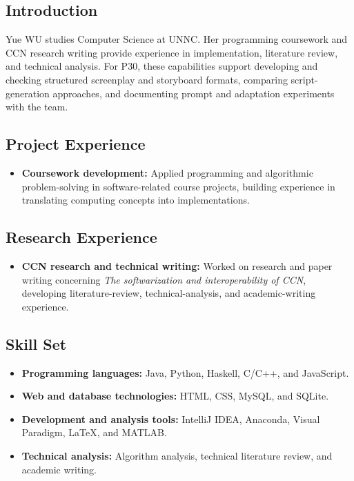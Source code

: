 \documentclass[a4paper,12pt]{article}
\begin{document}
\subsection*{Introduction}
Yue WU studies Computer Science at UNNC. Her programming coursework and CCN research writing provide experience in implementation, literature review, and technical analysis. For P30, these capabilities support developing and checking structured screenplay and storyboard formats, comparing script-generation approaches, and documenting prompt and adaptation experiments with the team.

\subsection*{Project Experience}
\begin{itemize}
  \item \textbf{Coursework development:} Applied programming and algorithmic problem-solving in software-related course projects, building experience in translating computing concepts into implementations.
\end{itemize}

\subsection*{Research Experience}
\begin{itemize}
  \item \textbf{CCN research and technical writing:} Worked on research and paper writing concerning \emph{The softwarization and interoperability of CCN}, developing literature-review, technical-analysis, and academic-writing experience.
\end{itemize}

\subsection*{Skill Set}
\begin{itemize}
  \item \textbf{Programming languages:} Java, Python, Haskell, C/C++, and JavaScript.
  \item \textbf{Web and database technologies:} HTML, CSS, MySQL, and SQLite.
  \item \textbf{Development and analysis tools:} IntelliJ IDEA, Anaconda, Visual Paradigm, LaTeX, and MATLAB.
  \item \textbf{Technical analysis:} Algorithm analysis, technical literature review, and academic writing.
\end{itemize}
\end{document}
